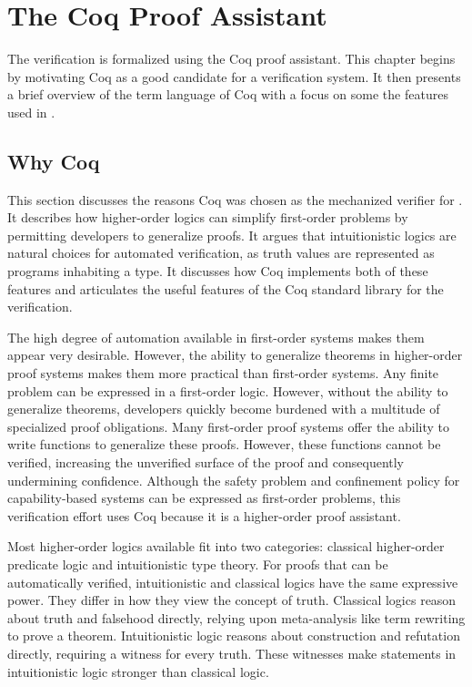 \chapter{The Coq Proof Assistant}
\label{ch:coq}

The \TMmodelName{} verification is formalized using the Coq proof assistant.
This chapter begins by motivating Coq as a good candidate for a verification system.
It then presents a brief overview of the term language of Coq with a focus on some the features used in \TMmodelName{}.

\section{Why Coq}

This section discusses the reasons Coq was chosen as the mechanized verifier for \TMmodelName{}.
It describes how higher-order logics can simplify first-order problems by permitting developers to generalize proofs.
It argues that intuitionistic logics are natural choices for automated verification, as truth values are represented as programs inhabiting a type.
It discusses how Coq implements both of these features and articulates the useful features of the Coq standard library for the \TMmodelName{} verification.

The high degree of automation available in first-order systems makes them appear very desirable.
However, the ability to generalize theorems in higher-order proof systems makes them more practical than first-order systems.
Any finite problem can be expressed in a first-order logic.
However, without the ability to generalize theorems, developers quickly become burdened with a multitude of specialized proof obligations.
Many first-order proof systems offer the ability to write functions to generalize these proofs.
However, these functions cannot be verified, increasing the unverified surface of the proof and consequently undermining confidence.
Although the safety problem and confinement policy for capability-based systems can be expressed as first-order problems, this verification effort uses Coq because it is a higher-order proof assistant.

Most higher-order logics available fit into two categories: classical higher-order predicate logic and intuitionistic type theory.
For proofs that can be automatically verified, intuitionistic and classical logics have the same expressive power.
They differ in how they view the concept of truth.
Classical logics reason about truth and falsehood directly, relying upon meta-analysis like term rewriting to prove a theorem.
Intuitionistic logic reasons about construction and refutation directly, requiring a witness for every truth.
These witnesses make statements in intuitionistic logic stronger than classical logic.

